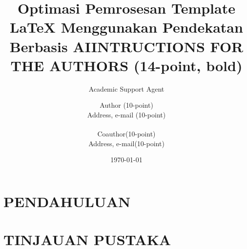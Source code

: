 \documentclass{article}
\title{Optimasi Pemrosesan Template LaTeX Menggunakan Pendekatan Berbasis AI}
\author{Academic Support Agent}
\date{\today}
\begin{document}
\maketitle

\begin{abstract}

\end{abstract}

\chapter{PENDAHULUAN}


\chapter{TINJAUAN PUSTAKA}


\usepackage{ja19_eng}
\usepackage[dvips]{graphicx}
\usepackage[ansinew]{inputenc}

\title{INTRUCTIONS FOR THE AUTHORS (14-point, bold)}

\author{Author (10-point)\\Address, e-mail (10-point) \\ \\ Coauthor(10-point)\\ Address, e-mail(10-point)}
\end{document}
